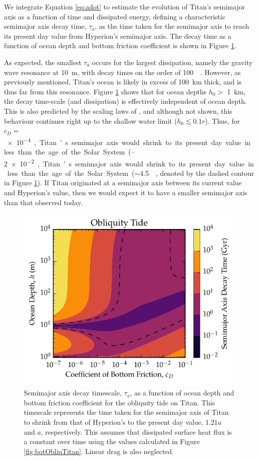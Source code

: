 We integrate Equation \ref{eq:adot} to estimate the evolution of Titan's semimajor axis as a function of time and dissipated energy, defining a characteristic semimajor axis decay time, $\tau_{a}$, as the time taken for the semimajor axis to reach its present day value from Hyperion's semimajor axis. The decay time as a function of ocean depth and bottom friction coefficient is shown in Figure \ref{fig:a_evo}.
  
As expected, the smallest $\tau_a$ occurs for the largest dissipation, namely the gravity wave resonance at \SI{10}{\metre}, with decay times on the order of \SI{100}{\mega\year}. However, as previously mentioned, Titan's ocean is likely in excess of \SI{100}{\kilo\metre} thick, and is thus far from this resonance. Figure \ref{fig:a_evo} shows that for ocean depths $h_0 >$ \SI{1}{\kilo\metre}, the decay time-scale (and dissipation) is effectively independent of ocean depth. This is also predicted by the scaling laws of \citet{chen2013tidal}, and although not shown, this behaviour continues right up to the shallow water limit ($h_0 \lesssim 0.1r$). Thus, for $c_D =$ \SIrange{e-4}{2e-2}, Titan's semimajor axis would shrink to its present day value in less than the age of the Solar System ($\sim$\SI{4.5}{\giga\year}, denoted by the dashed contour in Figure \ref{fig:a_evo}). If Titan originated at a semimajor axis between its current value and Hyperion's value, then we would expect it to have a smaller semimajor axis than that observed today.

\begin{figure}[!t]
\centering
\includegraphics[width=\linewidth]{Figures/titan_timescale}
\caption{Semimajor axis decay timescale, $\tau_a$, as a function of ocean depth and bottom friction coefficient for the obliquity tide on Titan. This timescale represents the time taken for the semimajor axis of Titan to shrink from that of Hyperion's to the present day value, $1.21a$ and $a$, respectively. This assumes that dissipated surface heat flux is a constant over time using the values calculated in Figure \ref{fig:botObliqTitan}. Linear drag is also neglected.   \label{fig:a_evo}}
\end{figure}

